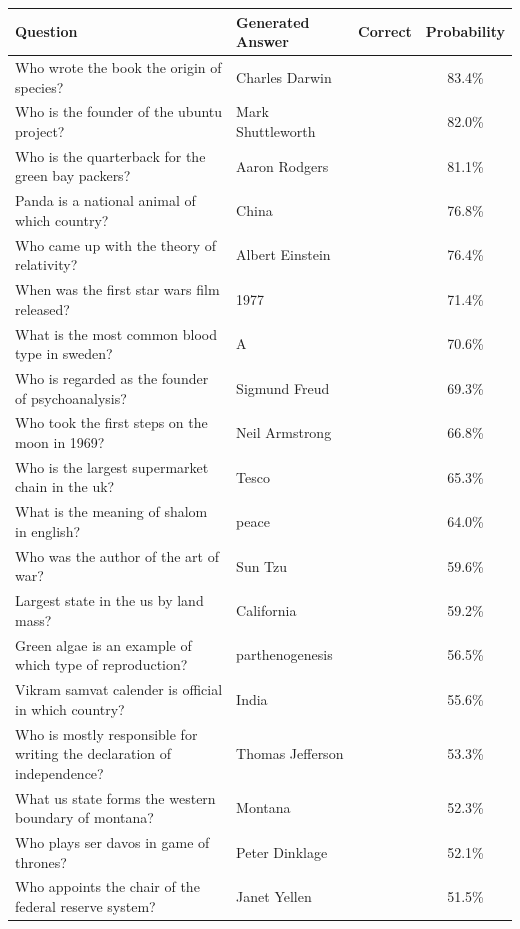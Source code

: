 \documentclass{article}
\newcommand{\cmark}{\ding{51}}%
\newcommand{\xmark}{\ding{55}}%
\begin{document}
\begin{table}[t]
\vskip 0.15in
\begin{center}
\begin{scriptsize}
\begin{tabular}{llcc}
\toprule
Question & Generated Answer & Correct & Probability \\
\midrule
Who wrote the book the origin of species? & Charles Darwin & \cmark & 83.4\% \\
Who is the founder of the ubuntu project? & Mark Shuttleworth & \cmark & 82.0\% \\
Who is the quarterback for the green bay packers? & Aaron Rodgers & \cmark & 81.1\% \\
Panda is a national animal of which country? & China & \cmark & 76.8\% \\
Who came up with the theory of relativity? & Albert Einstein & \cmark & 76.4\% \\
When was the first star wars film released? & 1977 & \cmark & 71.4\% \\
What is the most common blood type in sweden? & A & \xmark & 70.6\% \\
Who is regarded as the founder of psychoanalysis? & Sigmund Freud & \cmark & 69.3\% \\
Who took the first steps on the moon in 1969? & Neil Armstrong & \cmark & 66.8\% \\
Who is the largest supermarket chain in the uk? & Tesco & \cmark & 65.3\% \\
What is the meaning of shalom in english? & peace & \cmark & 64.0\% \\
Who was the author of the art of war? & Sun Tzu & \cmark & 59.6\% \\
Largest state in the us by land mass? & California & \xmark & 59.2\% \\
Green algae is an example of which type of reproduction? & parthenogenesis & \xmark & 56.5\% \\
Vikram samvat calender is official in which country? & India & \cmark & 55.6\% \\
Who is mostly responsible for writing the declaration of independence? & Thomas Jefferson & \cmark & 53.3\% \\
What us state forms the western boundary of montana? & Montana & \xmark & 52.3\% \\
Who plays ser davos in game of thrones? & Peter Dinklage & \xmark & 52.1\% \\
Who appoints the chair of the federal reserve system? & Janet Yellen & \xmark & 51.5\% \\

\end{tabular}
\end{scriptsize}
\end{center}
\end{table}
\end{document}
